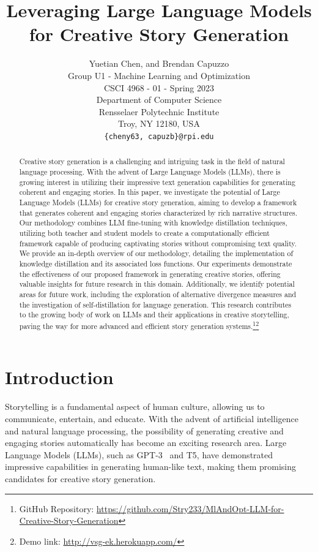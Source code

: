 \documentclass{article} %
\title{Leveraging Large Language Models for Creative Story Generation}
\author{Yuetian Chen, and Brendan Capuzzo \\
Group U1 - Machine Learning and Optimization \\
CSCI 4968 - 01 - Spring 2023\\
Department of Computer Science\\
Rensselaer Polytechnic Institute\\
Troy, NY 12180, USA \\
\texttt{\{cheny63, capuzb\}@rpi.edu} \\
}
\begin{document}
\maketitle

\begin{abstract}
Creative story generation is a challenging and intriguing task in the field of natural language processing. With the advent of Large Language Models (LLMs), there is growing interest in utilizing their impressive text generation capabilities for generating coherent and engaging stories. In this paper, we investigate the potential of Large Language Models (LLMs) for creative story generation, aiming to develop a framework that generates coherent and engaging stories characterized by rich narrative structures. Our methodology combines LLM fine-tuning with knowledge distillation techniques, utilizing both teacher and student models to create a computationally efficient framework capable of producing captivating stories without compromising text quality. We provide an in-depth overview of our methodology, detailing the implementation of knowledge distillation and its associated loss functions. Our experiments demonstrate the effectiveness of our proposed framework in generating creative stories, offering valuable insights for future research in this domain. Additionally, we identify potential areas for future work, including the exploration of alternative divergence measures and the investigation of self-distillation for language generation. This research contributes to the growing body of work on LLMs and their applications in creative storytelling, paving the way for more advanced and efficient story generation systems.\footnote{GitHub Repository: \hyperref[https://github.com/Stry233/MlAndOpt-LLM-for-Creative-Story-Generation]{https://github.com/Stry233/MlAndOpt-LLM-for-Creative-Story-Generation}}\footnote{Demo link: \hyperref[http://vsg-ek.herokuapp.com/]{http://vsg-ek.herokuapp.com/}}
\end{abstract}

\section{Introduction}

Storytelling is a fundamental aspect of human culture, allowing us to communicate, entertain, and educate. With the advent of artificial intelligence and natural language processing, the possibility of generating creative and engaging stories automatically has become an exciting research area. Large Language Models (LLMs), such as GPT-3~\cite{brown2020language} and T5, have demonstrated impressive capabilities in generating human-like text, making them promising candidates for creative story generation.
\end{document}
